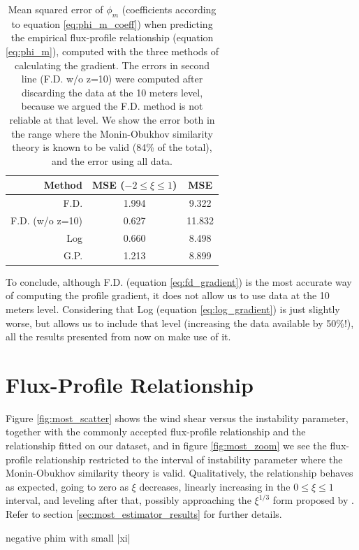 \documentclass[a4paper]{book}
\begin{document}
\begin{table}[]
\centering
\caption{Mean squared error of $\phi_m$ (coefficients according to equation \ref{eq:phi_m_coeff}) when predicting the empirical flux-profile relationship (equation \ref{eq:phi_m}), computed with the three methods of calculating the gradient. The errors in second line (F.D. w/o z=10) were computed after discarding the data at the 10 meters level, because we argued the F.D. method is not reliable at that level. We show the error both in the range where the Monin-Obukhov similarity theory is known to be valid (84\% of the total), and the error using all data.}
\label{tbl:gradient_errors}
\begin{tabular}{r|c|c}
\toprule
Method & MSE ($-2\leq\xi\leq1$) & MSE \\ \midrule
F.D. & 1.994 & 9.322 \\
F.D. (w/o z=10) & 0.627  & 11.832 \\
Log & 0.660 & 8.498 \\
G.P. & 1.213 & 8.899 \\
\bottomrule
\end{tabular}
\end{table}

To conclude, although F.D. (equation \ref{eq:fd_gradient}) is the most accurate way of computing the profile gradient, it does not allow us to use data at the 10 meters level. Considering that Log (equation \ref{eq:log_gradient}) is just slightly worse, but allows us to include that level (increasing the data available by 50\%!), all the results presented from now on make use of it.


\section{Flux-Profile Relationship}
Figure \ref{fig:most_scatter} shows the wind shear versus the instability parameter, together with the commonly accepted flux-profile relationship and the relationship fitted on our dataset, and in figure \ref{fig:most_zoom} we see the flux-profile relationship restricted to the interval of instability parameter where the Monin-Obukhov similarity theory is valid. Qualitatively, the relationship behaves as expected, going to zero as $\xi$ decreases, linearly increasing in the $0\leq\xi\leq1$ interval, and leveling after that, possibly approaching the $\xi^{1/3}$ form proposed by \cite{sheba_phim}. Refer to section \ref{sec:most_estimator_results} for further details.

negative phim with small |xi|
\end{document}
